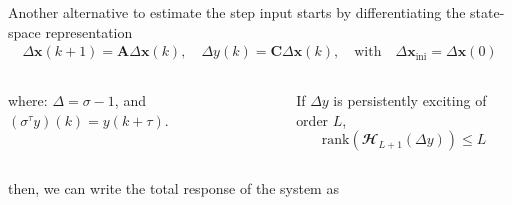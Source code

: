 \documentclass[presentation]{beamer}
\begin{document}
\begin{frame}[label={slide:preliminaries6}]{Another alternative to estimate the step input \linebreak starts by differentiating the state-space representation} 
\begin{equation*} \begin{aligned} \Delta \mathbf{x}(k+1) = \mathbf{A} \Delta \mathbf{x}(k), \quad \Delta {y}(k) = \mathbf{C} \Delta \mathbf{x}(k), \quad \text{with} \quad \Delta \mathbf{x}_{\text{ini}} = \Delta \mathbf{x}(0) \end{aligned} \end{equation*}
\begin{columns}
\begin{column}{0.35\columnwidth}
where: \linebreak $\Delta = \sigma - 1$, and \linebreak $(\sigma^\tau y) (k) = y(k + \tau)$.
\end{column}
\begin{column}{0.65\columnwidth}
If $\Delta {y}$ is persistently exciting of order $L$, 
\begin{equation*} \mathrm{rank} \left( \mathbfcal{H}_{L+1} \left( \Delta {y} \right) \right) \leq L  \end{equation*} 
\end{column}
\end{columns}
\linebreak 
then, we can write the total response of the system as  

\end{frame}
\end{document}
